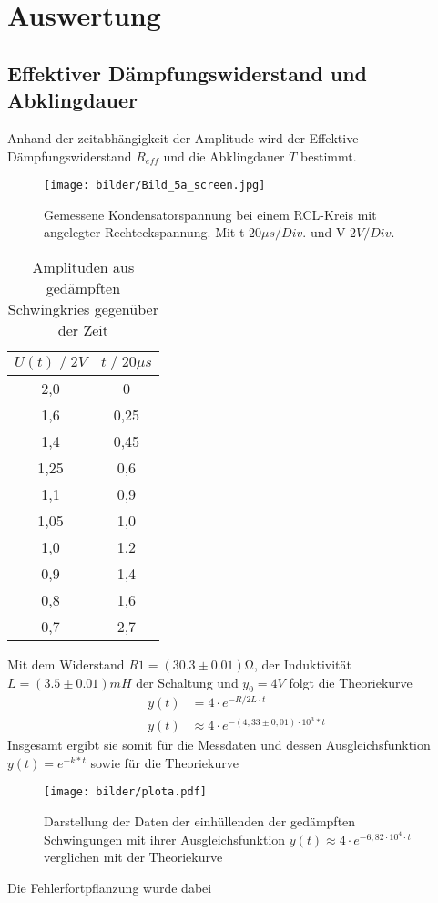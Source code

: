 \newpage
\section{Auswertung}
\subsection{Effektiver Dämpfungswiderstand und Abklingdauer}
Anhand der zeitabhängigkeit der Amplitude wird der Effektive Dämpfungswiderstand $R_{eff}$
und die Abklingdauer $T$ bestimmt. 
\begin{figure}
    \centering
    \texttt{[image: bilder/Bild\_5a\_screen.jpg]}
    \caption{
        Gemessene Kondensatorspannung bei einem RCL-Kreis mit angelegter Rechteckspannung. 
        Mit t $20\mu s/Div.$ und V $ 2V/Div.$
        }
    \label{fig:bild1}
\end{figure}

\begin{table}
    \centering
    \begin{tabular}{c c}
        \toprule
        $U(t)\;/\;2V$ & $t\;/\;20\mu s$\\
        \midrule
        2,0     &0   \\
        1,6     &0,25\\
        1,4     &0,45\\
        1,25    &0,6\\
        1,1     &0,9\\
        1,05    &1,0\\
        1,0     &1,2\\
        0,9     &1,4\\
        0,8     &1,6\\
        0,7     &2,7\\
        \bottomrule
    \end{tabular}
    \caption{Amplituden aus gedämpften Schwingkries gegenüber der Zeit}
    \label{tab:tabelle1}
\end{table}

Mit dem Widerstand $R1=(30.3\pm0.01)\si{\ohm}$, der Induktivität $L=(3.5 \pm 0.01)mH$ der Schaltung und $y_0=4V$ folgt die Theoriekurve
\begin{align}
    y(t)&=4 \cdot e^{-R/2L \cdot t}\\
    y(t)&\approx 4 \cdot e^{-(4,33\pm0,01) \cdot 10^3*t}
\end{align}
\newpage
Insgesamt ergibt sie somit für die Messdaten und dessen Ausgleichsfunktion $y(t)=e^{-k*t}$
sowie für die Theoriekurve
\begin{figure}
    \centering
    \texttt{[image: bilder/plota.pdf]}
    \caption{
        Darstellung der Daten der einhüllenden der gedämpften Schwingungen mit ihrer
        Ausgleichsfunktion $y(t)\approx 4 \cdot e^{-6,82\cdot10^4 \cdot t}$ verglichen mit der Theoriekurve
    }
    \label{fig:ultra_plot}
\end{figure}
Die Fehlerfortpflanzung wurde dabei 




